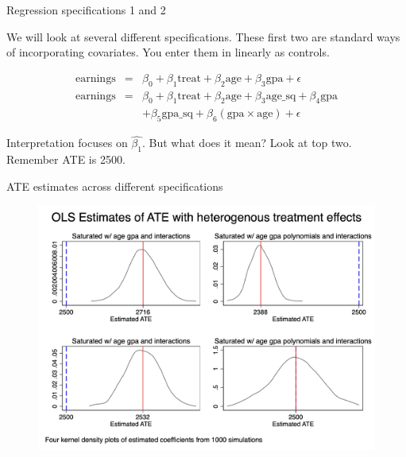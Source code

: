 \documentclass{beamer}
\begin{document}
\begin{frame}{Regression specifications 1 and 2}

We will look at several different specifications.  These first two are standard ways of incorporating covariates. You enter them in linearly as controls. 

\begin{eqnarray}
\text{earnings} &=& \beta_0 + \beta_1 \text{treat} + \beta_2 \text{age} + \beta_3 \text{gpa} + \epsilon \\
\text{earnings} &=& \beta_0 + \beta_1 \text{treat} + \beta_2 \text{age} + \beta_3 \text{age\_sq} + \beta_4 \text{gpa} \nonumber \\
&&+ \beta_5 \text{gpa\_sq} + \beta_6 (\text{gpa} \times \text{age}) + \epsilon 
\end{eqnarray}

\bigskip

Interpretation focuses on $\widehat{\beta_1}$.  But what does it mean?  Look at top two.  Remember ATE is 2500.

\end{frame}

\begin{frame}{ATE estimates across different specifications}

\begin{figure}
\begin{center}
             \includegraphics[scale=0.1]{./lecture_includes/combined_kernels_ate.jpg}
\end{center}
\end{figure}

\end{frame}
\end{document}
